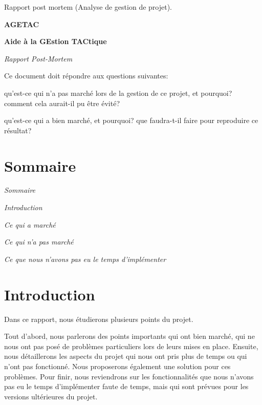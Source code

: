 \documentclass{article}
\begin{document}
\baselineskip=13pt
{\color{color01} Rapport post mortem (Analyse de gestion de projet). }

\vspace{55pt}
\begin{center}
{\Huge {\color{color01} \textbf{AGETAC}}}

{\Huge {\color{color01} \textbf{Aide à la GEstion TACtique}}}

\vspace{41pt}
{\huge {\color{color02} \textit{Rapport Post-Mortem}}}
\end{center}

\vspace{138pt}
{\color{color01} Ce document doit répondre aux questions suivantes:}

\leftskip=36pt
\parindent=-18pt
{\color{color01} qu'est-ce qui n'a pas marché lors de la gestion de ce projet, 
et pourquoi? comment cela aurait-il pu être évité?}

{\color{color01} qu'est-ce qui a bien marché, et pourquoi? que faudra-t-il faire 
pour reproduire ce résultat?\label{h.rzqw1zvcpnvw}}

\vspace{51pt}
\section*{{\LARGE {\color{color01} \textbf{Sommaire}}}}

\vspace{13pt}
\leftskip=18pt
\parindent=0pt
{\color{color03} \emph{Sommaire}}

{\color{color03} \emph{Introduction}}

{\color{color03} \emph{Ce qui a marché}}

{\color{color03} \emph{Ce qui n'a pas marché}}

{\color{color03} \emph{Ce que nous n'avons pas eu le temps d'implémenter\label{h.hqop80fo4yag}\label{h.9rnlmycclih6}\label{h.dbnzf7me2hmh}}}

\vspace{106pt}
\section*{{\LARGE {\color{color01} \textbf{Introduction}}}}

\vspace{13pt}
\leftskip=0pt
{\color{color01} Dans ce rapport, nous étudierons plusieurs points du projet.}

{\color{color01} Tout d'abord, nous parlerons des points importants qui ont bien 
marché, qui ne nous ont pas posé de problèmes particuliers lors de leurs mises 
en place. Ensuite, nous détaillerons les aspects du projet qui nous ont pris plus 
de temps ou qui n'ont pas fonctionné. Nous proposerons également une solution 
pour ces problèmes. Pour finir, nous reviendrons sur les fonctionnalités que 
nous n'avons pas eu le temps d'implémenter faute de temps, mais qui sont prévues 
pour les versions ultérieures du projet.\label{h.mqlx3ywo6evw}}
\end{document}
